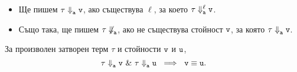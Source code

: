 \begin{itemize}
\item 
  Ще пишем $\tau \Downarrow^{}_{\texttt{a}} \texttt{v}$, ако съществува $\ell$, за което $\tau \Downarrow^{\ell}_{\texttt{a}} \texttt{v}$.  
\item
  Също така, ще пишем $\tau \not\Downarrow^{}_{\texttt{a}}$, ако не съществува стойност $\texttt{v}$, за която $\tau \Downarrow^{}_{\texttt{a}} \texttt{v}$.  
\end{itemize}

\begin{lemma}
  За произволен затворен терм $\tau$ и стойности $\texttt{v}$ и $\texttt{u}$,
  \[\tau \Downarrow^{}_{\texttt{a}} \texttt{v}\ \&\ \tau \Downarrow^{}_{\texttt{a}} \texttt{u}\ \implies\ \texttt{v} \equiv \texttt{u}.\]
\end{lemma}







